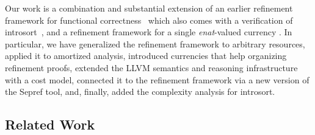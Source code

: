 \documentclass[acmsmall]{acmart}
\begin{document}

Our work is a combination and substantial extension of an earlier refinement framework for functional correctness~\cite{lammich2019LLVM} which also comes with a verification of introsort~\cite{Lammich20}, and a refinement framework for a single \emph{enat}-valued currency \cite{HaslbeckL19}.
In particular, we have generalized the refinement framework to arbitrary resources, applied it to amortized analysis,
introduced currencies that help organizing refinement proofs, extended the LLVM semantics and reasoning infrastructure with a cost model, connected it to the refinement framework via a new version of the Sepref tool, and, finally, added the complexity analysis for introsort.



\subsection{Related Work}




\end{document}
